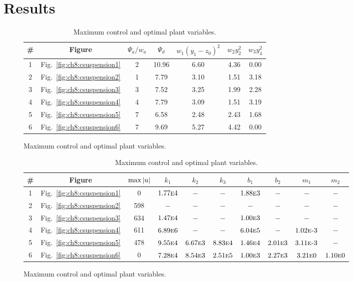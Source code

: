 \section{Results\label{sec:ch8:results}}

\begin{table}
\centering
\small

\begin{subfigure}[b]{\textwidth}
\centering
\caption{Maximum control and optimal plant variables.}
\begin{tabular}{ccccccc}
\hline \hline 
\# & Figure & $\Psi_a/w_a$ & $\Psi_d$ & $w_1 \left( y_1 - z_0 \right)^2$ & $w_2 y_2^2$ & $w_3 y_4^2$ \\
\hline 
1 & Fig.~\ref{fig:ch8:csuspension1} & 2 & 10.96 & 6.60 & 4.36 & 0.00 \\
2 & Fig.~\ref{fig:ch8:csuspension2} & 1 & 7.79 & 3.10 & 1.51 & 3.18 \\
3 & Fig.~\ref{fig:ch8:csuspension3} & 3 & 7.52 & 3.25 & 1.99 & 2.28 \\
4 & Fig.~\ref{fig:ch8:csuspension4} & 4 & 7.79 & 3.09 & 1.51 & 3.19 \\
5 & Fig.~\ref{fig:ch8:csuspension5} & 7 & 6.58 & 2.48 & 2.43 & 1.68 \\
6 & Fig.~\ref{fig:ch8:csuspension6} & 7 & 9.69 & 5.27 & 4.42 & 0.00 \\
\hline \hline 
\end{tabular}
\end{subfigure}%

\vspace{2px}

\begin{subfigure}[t]{\textwidth}
\centering
\caption{Maximum control and optimal plant variables.}
\begin{tabular}{cccccccccc}
\hline \hline 
\# & Figure & $\max{\lvert u\rvert}$ & $k_1$ & $k_2$ & $k_3$ & $b_1$ & $b_2$ & $m_1$ & $m_2$ \\
\hline 
1 & Fig.~\ref{fig:ch8:csuspension1} & 0 & $1.77\textsc{e}4$ & $-$ & $-$ & $1.88\textsc{e}3$ & $-$ & $-$ & $-$ \\
2 & Fig.~\ref{fig:ch8:csuspension2} & 598 & $-$ & $-$ & $-$ & $-$ & $-$ & $-$ & $-$ \\
3 & Fig.~\ref{fig:ch8:csuspension3} & 634 & $1.47\textsc{e}4$ & $-$ & $-$ & $1.00\textsc{e}3$ & $-$ & $-$ & $-$ \\
4 & Fig.~\ref{fig:ch8:csuspension4} & 611 & $6.89\textsc{e}6$ & $-$ & $-$ & $6.04\textsc{e}5$ & $-$ & $1.02\textsc{e-}3$ & $-$ \\
5 & Fig.~\ref{fig:ch8:csuspension5} & 478 & $9.55\textsc{e}4$ & $6.67\textsc{e}3$ & $8.83\textsc{e}4$ & $1.46\textsc{e}4$ & $2.01\textsc{e}3$ & $3.11\textsc{e-}3$ & $-$ \\
6 & Fig.~\ref{fig:ch8:csuspension6} & 0 & $7.28\textsc{e}4$ & $8.54\textsc{e}3$ & $2.51\textsc{e}5$ & $1.00\textsc{e}3$ & $2.27\textsc{e}3$ & $3.21\textsc{e}0$ & $1.10\textsc{e}0$ \\
\hline \hline 
\end{tabular}
\end{subfigure}%


\end{table}
